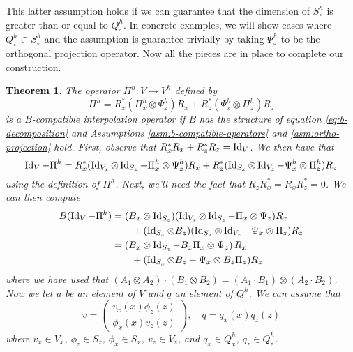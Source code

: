 \documentclass{article}
\theoremstyle{definition}
\theoremstyle{plain}
\newtheorem{thm}{Theorem}
\newcommand{\Id}[1]{\operatorname{Id} #1}
\begin{document}
This latter assumption holds if we can guarantee that the dimension of $S_\circ^h$ is greater than or equal to $Q_\circ^h$.
In concrete examples, we will show cases where $Q_\circ^h \subset S_\circ^h$ and the assumption is guarantee trivially by taking $\Psi_\circ^h$ to be the orthogonal projection operator.
Now all the pieces are in place to complete our construction.
\begin{thm}\label{thm:main-theorem} The operator $\Pi^h : V \to V^h$ defined by
\begin{equation}
    \Pi^h = R_x^*(\Pi_x^h\otimes\Psi_z^h)R_x + R_z^*(\Psi_x^h\otimes\Pi_z^h)R_z
\end{equation}
    is a $B$-compatible interpolation operator if $B$ has the structure of equation \eqref{eq:b-decomposition} and Assumptions \ref{asm:b-compatible-operators} and \ref{asm:ortho-projection} hold.
    \proof First, observe that $R_x^*R_x + R_z^*R_z = \Id_V$.
    We then have that
    \begin{equation}
        \Id_V - \Pi^h = R_x^*(\Id_{V_x}\otimes\Id_{S_z} - \Pi_x^h\otimes\Psi_z^h)R_x + R_z^*(\Id_{S_x}\otimes\Id_{V_z} - \Psi_x^h\otimes\Pi_z^h)R_z
    \end{equation}
    using the definition of $\Pi^h$.
    Next, we'll need the fact that $R_zR_x^* = R_xR_z^* = 0$.
    We can then compute
    \begin{align}
        B(\Id_V - \Pi^h) & = (B_x\otimes \Id_{S_z})(\Id_{V_x}\otimes\Id_{S_z} - \Pi_x\otimes\Psi_z)R_x \nonumber\\
        & \qquad + (\Id_{S_x}\otimes B_z)(\Id_{S_x}\otimes\Id_{V_z} - \Psi_x\otimes\Pi_z)R_z \\
        & = \left(B_x\otimes\Id_{S_z} - B_x\Pi_x\otimes\Psi_z\right)R_x \nonumber \\
        & \qquad + (\Id_{S_x}\otimes B_z - \Psi_x\otimes B_z\Pi_z)R_z
        \label{eq:b-id-pi}
    \end{align}
    where we have used that $(A_1\otimes A_2)\cdot(B_1\otimes B_2) = (A_1\cdot B_1)\otimes(A_2\cdot B_2)$.
    Now we let $u$ be an element of $V$ and $q$ an element of $Q^h$.
    We can assume that
    \begin{equation}
        v = \left(\begin{matrix}v_x(x)\phi_z(z) \\ \phi_x(x)v_z(z)\end{matrix}\right), \quad q = q_x(x)q_z(z)
    \end{equation}
    where $v_x \in V_x$, $\phi_z \in S_z$, $\phi_x \in S_x$, $v_z \in V_z$, and $q_x \in Q_x^h$, $q_z \in Q_z^h$.

\end{thm}
\end{document}
